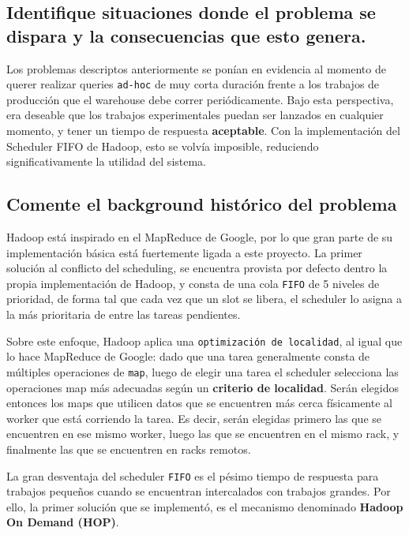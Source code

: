 \documentclass[11pt, a4paper, twoside]{article}
\begin{document}
\clearpage
\subsection {\footnotesize Identifique situaciones donde el problema se dispara y la consecuencias que esto genera.}
\label{investigacion-3}

Los problemas descriptos anteriormente se ponían en evidencia al momento de
querer realizar queries \texttt{ad-hoc} de muy corta duración frente a los
trabajos de producción que el warehouse debe correr periódicamente. Bajo esta
perspectiva, era deseable que los trabajos experimentales puedan ser lanzados
en cualquier momento, y tener un tiempo de respuesta \textbf{aceptable}. Con
la implementación del Scheduler FIFO de Hadoop, esto se volvía imposible,
reduciendo significativamente la utilidad del sistema.

\fixme


\clearpage


\subsection {\footnotesize Comente el background histórico del problema}
\label{investigacion-4}
Hadoop está inspirado en el MapReduce de Google, por lo que gran parte de su
implementación básica está fuertemente ligada a este proyecto. La primer
solución al conflicto del scheduling, se encuentra provista por defecto dentro
la propia implementación de Hadoop, y consta de una cola \texttt{FIFO} de 5
niveles de prioridad, de forma tal que cada vez que un slot se libera, el
scheduler lo asigna a la más prioritaria de entre las tareas pendientes.

Sobre este enfoque, Hadoop aplica una \texttt{optimización de localidad}, al
igual que lo hace MapReduce de Google: dado que una tarea generalmente consta de
múltiples operaciones de \texttt{map}, luego de elegir una tarea el scheduler
selecciona las operaciones map más adecuadas según un \textbf{criterio de
localidad}. Serán elegidos entonces los maps que utilicen datos que se
encuentren más cerca físicamente al worker que está corriendo la tarea. Es
decir, serán elegidas primero las que se encuentren en ese mismo worker, luego
las que se encuentren en el mismo rack, y finalmente las que se encuentren en
racks remotos.

La gran desventaja del scheduler \texttt{FIFO} es el pésimo tiempo de respuesta
para trabajos pequeños cuando se encuentran intercalados con trabajos grandes.
Por ello, la primer solución que se implementó, es el mecanismo denominado
\textbf{Hadoop On Demand (HOP)}.
\end{document}
